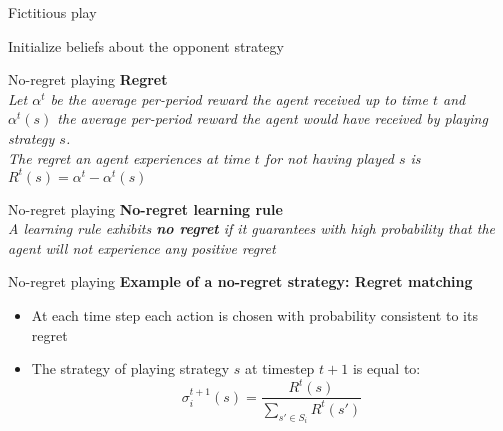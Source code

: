 \begin{frame}{Fictitious play}
    \begin{algorithm}[H]
         Initialize beliefs about the opponent strategy\;
    \caption{Fictitious play algorithm}
    \end{algorithm}
\end{frame}


\begin{frame}{No-regret playing}
    \textbf{Regret}\\
    \textit{Let $\alpha^t$ be the average per-period reward the agent received up to time $t$ and $\alpha^t(s)$ the average per-period reward the agent would have received by playing strategy $s$.}\\
    \textit{The regret an agent experiences at time $t$ for not having played $s$ is $R^t(s)=\alpha^t-\alpha^t(s)$}
\end{frame}

\begin{frame}{No-regret playing}
    \textbf{No-regret learning rule}\\
    \textit{A learning rule exhibits \textbf{no regret} if it guarantees with high probability that the agent will not experience any positive regret}
\end{frame}

\begin{frame}{No-regret playing}
    \textbf{Example of a no-regret strategy: Regret matching}\\
    \begin{itemize}
        \item At each time step each action is chosen with probability consistent to its regret
        \item The strategy of playing strategy $s$ at timestep $t+1$ is equal to:
        \[
            \sigma_i^{t+1}(s)= \frac{R^t(s)}{\sum_{s'\in S_i} R^t(s')}
        \]
    \end{itemize}
\end{frame}
